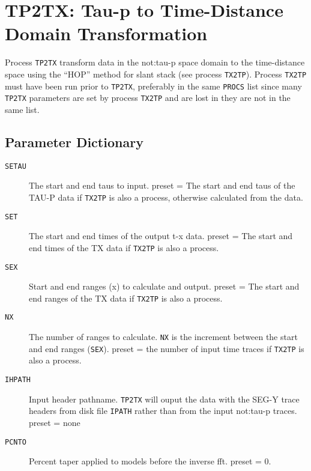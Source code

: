\section{TP2TX: Tau-p to Time-Distance Domain Transformation}
\label{cmd_tp2tx}

Process \texttt{TP2TX} transform data in the \gls{not:tau}-p space domain to the
time-distance space using the ``HOP'' method for slant stack (see
process \texttt{TX2TP}).  Process \texttt{TX2TP} must have been run prior to \texttt{TP2TX},
preferably in the same \texttt{PROCS} list since many \texttt{TP2TX} parameters are
set by process \texttt{TX2TP} and are lost in they are not in the same list.

\subsection{Parameter Dictionary}

\begin{description}
\item[\texttt{SETAU}] The start and end taus to input.
         \Gls{preset} = The start and end taus of the TAU-P data if \texttt{TX2TP} is
                  also a process, otherwise calculated from the data.

\item[\texttt{SET}] The start and end times of the output t-x data.
         \Gls{preset} = The start and end times of the TX data if \texttt{TX2TP} is
                  also a process.

\item[\texttt{SEX}] Start and end ranges (x) to calculate and output.
         \Gls{preset} = The start and end ranges of the TX data if \texttt{TX2TP} is
                  also a process.

\item[\texttt{NX}] The number of ranges to calculate.  \texttt{NX} is the increment
         between the start and end ranges (\texttt{SEX}).
         \Gls{preset} = the number of input time traces if \texttt{TX2TP} is
                  also a process.

\item[\texttt{IHPATH}] Input header pathname.  \texttt{TP2TX} will ouput the data with the
         SEG-Y trace headers from disk file \texttt{IPATH} rather than from the
         input \gls{not:tau}-p traces.
         \Gls{preset} =  none

\item[\texttt{PCNTO}] Percent taper applied to models before the inverse \gls{fft}.
         \Gls{preset} = 0.
\end{description}


